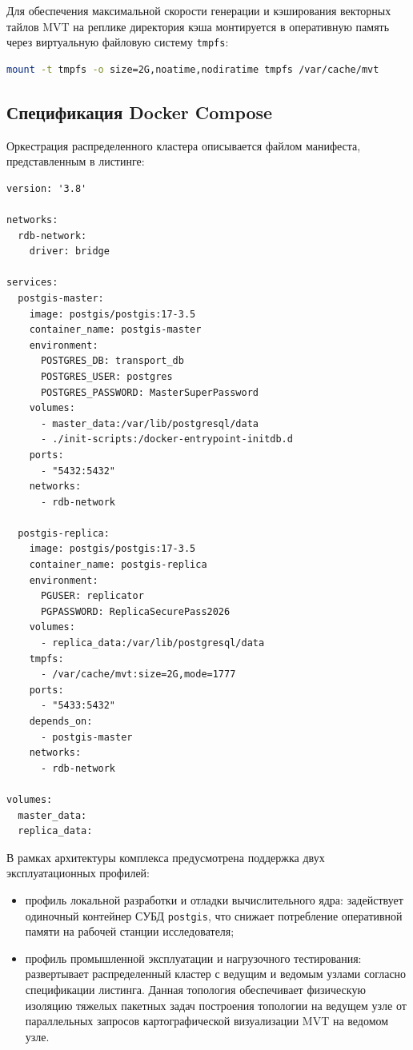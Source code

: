 Для обеспечения максимальной скорости генерации и кэширования векторных тайлов MVT на реплике директория кэша монтируется в оперативную память через виртуальную файловую систему \texttt{tmpfs}:
\begin{lstlisting}[language=bash, caption={Монтирование каталога буферов MVT в память}]
mount -t tmpfs -o size=2G,noatime,nodiratime tmpfs /var/cache/mvt
\end{lstlisting}

\subsection{Спецификация Docker Compose}

Оркестрация распределенного кластера описывается файлом манифеста, представленным в листинге:
\begin{lstlisting}[caption={Манифест \texttt{docker-compose.yml} распределенного кластера}]
version: '3.8'

networks:
  rdb-network:
    driver: bridge

services:
  postgis-master:
    image: postgis/postgis:17-3.5
    container_name: postgis-master
    environment:
      POSTGRES_DB: transport_db
      POSTGRES_USER: postgres
      POSTGRES_PASSWORD: MasterSuperPassword
    volumes:
      - master_data:/var/lib/postgresql/data
      - ./init-scripts:/docker-entrypoint-initdb.d
    ports:
      - "5432:5432"
    networks:
      - rdb-network

  postgis-replica:
    image: postgis/postgis:17-3.5
    container_name: postgis-replica
    environment:
      PGUSER: replicator
      PGPASSWORD: ReplicaSecurePass2026
    volumes:
      - replica_data:/var/lib/postgresql/data
    tmpfs:
      - /var/cache/mvt:size=2G,mode=1777
    ports:
      - "5433:5432"
    depends_on:
      - postgis-master
    networks:
      - rdb-network

volumes:
  master_data:
  replica_data:
\end{lstlisting}

В рамках архитектуры комплекса предусмотрена поддержка двух эксплуатационных профилей:
\begin{itemize}
    \item профиль локальной разработки и отладки вычислительного ядра: задействует одиночный контейнер СУБД \texttt{postgis}, что снижает потребление оперативной памяти на рабочей станции исследователя;
    \item профиль промышленной эксплуатации и нагрузочного тестирования: развертывает распределенный кластер с ведущим и ведомым узлами согласно спецификации листинга. Данная топология обеспечивает физическую изоляцию тяжелых пакетных задач построения топологии на ведущем узле от параллельных запросов картографической визуализации MVT на ведомом узле.
\end{itemize}
